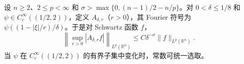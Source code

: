 设 $n\ge2$、$2\le p<\infty$ 和 $\sigma>\max\{0,(n-1)/2-n/p\}$。对 $0<\delta\le1/8$ 和 $\psi\in C_c^\infty((1/2,2))$，定义 $A_{\delta,r}$（$r>0$），其 Fourier 符号为 $\psi((1-|\xi|/r)/\delta)$。于是对 Schwartz 函数 $f$，
\[
\left\|\sup_{r>0}|A_{\delta,r}f|\right\|_{L^p(\mathbb R^n)}
\le C\delta^{-\sigma}\|f\|_{L^p(\mathbb R^n)}.
\]
当 $\psi$ 在 $C_c^\infty((1/2,2))$ 的有界子集中变化时，常数可统一选取。
